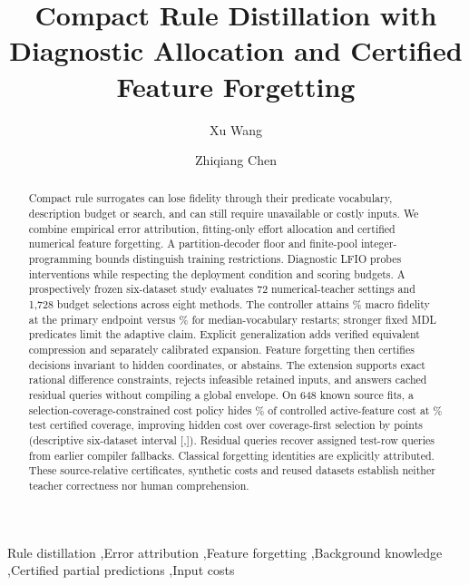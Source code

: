\documentclass[review,12pt]{elsarticle}
\begin{document}
\begin{frontmatter}
\title{Compact Rule Distillation with Diagnostic Allocation and Certified Feature Forgetting}
\author[1,2,3]{Xu Wang}
\author[1,2,3]{Zhiqiang Chen}
\begin{abstract}
Compact rule surrogates can lose fidelity through their predicate vocabulary, description budget or search, and can still require unavailable or costly inputs. We combine empirical error attribution, fitting-only effort allocation and certified numerical feature forgetting. A partition-decoder floor and finite-pool integer-programming bounds distinguish training restrictions. Diagnostic LFIO probes interventions while respecting the deployment condition and scoring budgets. A prospectively frozen six-dataset study evaluates 72 numerical-teacher settings and 1,728 budget selections across eight methods. The controller attains \IndependentDiagnosticBF\% macro fidelity at the primary endpoint versus \IndependentMedianBF\% for median-vocabulary restarts; stronger fixed MDL predicates limit the adaptive claim. Explicit generalization adds verified equivalent compression and separately calibrated expansion. Feature forgetting then certifies decisions invariant to hidden coordinates, or abstains. The extension supports exact rational difference constraints, rejects infeasible retained inputs, and answers cached residual queries without compiling a global envelope. On 648 known source fits, a selection-coverage-constrained cost policy hides \ContextCost\% of controlled active-feature cost at \ContextCoverage\% test certified coverage, improving hidden cost over coverage-first selection by \ContextGain{} points (descriptive six-dataset interval [\ContextGainLow,\ContextGainHigh]). Residual queries recover \ContextQueryGained{} assigned test-row queries from earlier compiler fallbacks. Classical forgetting identities are explicitly attributed. These source-relative certificates, synthetic costs and reused datasets establish neither teacher correctness nor human comprehension.
\end{abstract}
\begin{keyword}
Rule distillation \sep Error attribution \sep Feature forgetting \sep Background knowledge \sep Certified partial predictions \sep Input costs
\end{keyword}
\end{frontmatter}
\end{document}
